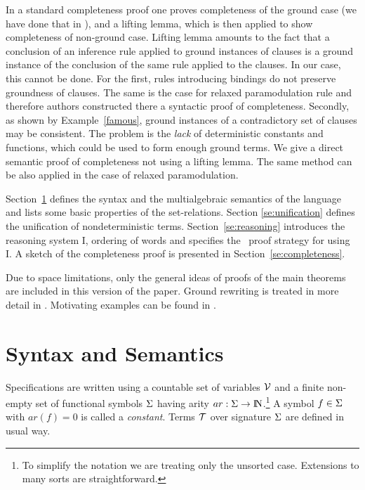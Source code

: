 In a standard completeness proof one
proves completeness of
the ground case (we have done that in \cite {KW}), and a lifting lemma, which is
then applied to show completeness of non-ground case.  Lifting
lemma amounts to the fact 
that a conclusion of an inference rule applied to ground
instances of clauses is a ground instance of the conclusion of the same rule
applied to the clauses.  
In our case, this cannot be done.
For the first, rules introducing bindings do
not preserve groundness of clauses. The same is the case for
relaxed paramodulation rule \cite {relaxed-par} and therefore
authors constructed there a syntactic proof of completeness.  
Secondly, as shown by Example~\ref{famous}, ground
instances of a contradictory set of clauses may be consistent.
The problem is the {\em lack}
of deterministic constants and functions, which could be used to
form enough  ground terms.
We give a direct semantic proof of completeness not using a lifting lemma.
The same method can be also applied in the case of relaxed paramodulation.

Section~\ref{se:nd-specs} defines the syntax and the multialgebraic semantics 
of the language and lists some basic properties of the set-relations. 
Section \ref{se:unification} defines the unification of nondeterministic terms.
Section~\ref{se:reasoning} introduces the reasoning system \C I, ordering of 
words and specifies the \strategy\ proof strategy for using \C I.
A sketch of the completeness proof is presented in
Section~\ref{se:completeness}.

Due to space limitations, only the general ideas of proofs of the main theorems
are included in this version of the paper. Ground rewriting is treated in more
detail in \cite{KW}. Motivating examples can be found in \cite{Mich,MW-II}.


\section{Syntax and Semantics}\label{se:nd-specs}

%
Specifications are written using a countable set of variables ${\cal V}$ and a
finite non-empty set of functional symbols $\Sigma$ having arity
\(ar:\Sigma\to {{\rm I\!N}}\).\footnote{To simplify the notation we are treating only
the unsorted case. Extensions to many sorts are straightforward.}  A symbol
\(f\in\Sigma\) with \(ar(f)=0\) is called a {\em constant}.  Terms ${\cal T}$
over signature $\Sigma$ are defined in usual way. 

